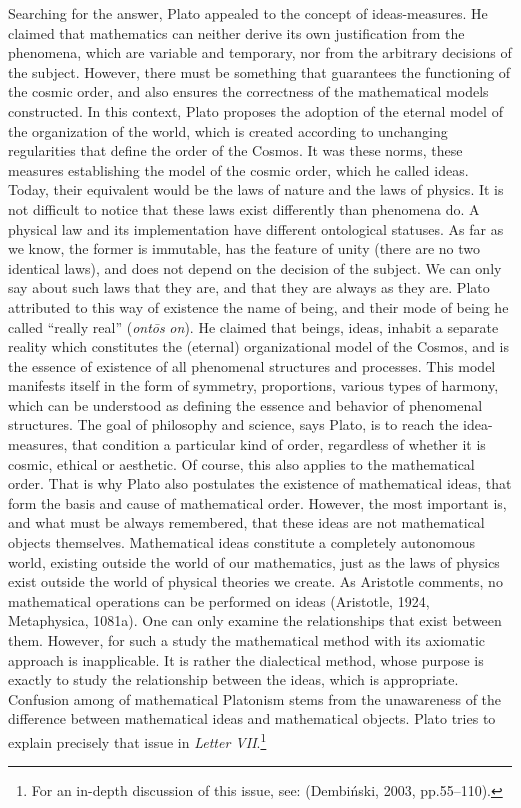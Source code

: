 \documentclass[a4paper]{article}
\begin{document}
Searching for the answer, Plato appealed to the concept of ideas-measures. He claimed that mathematics can neither
derive its own justification from the phenomena, which are variable and temporary, nor from the arbitrary decisions of
the subject. However, there must be something that guarantees the functioning of the cosmic order, and also ensures the
correctness of the mathematical models constructed. In this context, Plato proposes the %
adoption of the eternal model of the organization of the world, which is created according to unchanging regularities
that define the order of the Cosmos. It was these norms, these measures establishing the model of the cosmic order,
which he called ideas. Today, their equivalent would be the laws of nature and the laws of physics. It is not difficult
to notice that these laws exist differently than phenomena do. A physical law and its implementation have different
ontological statuses. As far as we know, the former is immutable, has the feature of unity (there are no two identical
laws), and does not depend on the decision of the subject. We can only say about such laws that they are, and that they
are always as they are. Plato attributed to this way of existence the name of being, and their mode of being he called
“really real” (\textit{ont\=os}\textbf{\textit{ }}\textit{on}). He claimed that beings, ideas, inhabit a separate
reality which constitutes the (eternal) organizational model of the Cosmos, and is the essence of existence of all
phenomenal structures and processes. This model manifests itself in the form of symmetry, proportions, various types of
harmony, which can be understood as defining the essence and behavior of phenomenal structures. The goal of philosophy
and science, says Plato, is to reach the idea-measures, that condition a particular kind of order, regardless of
whether it is cosmic, ethical or aesthetic. Of course, this also applies to the mathematical order. That is why Plato
also postulates the existence of mathematical ideas, that form the basis and cause of mathematical order. However, the
most important is, and what must be always remembered, that these ideas are not mathematical objects themselves.
Mathematical ideas constitute a completely autonomous world, existing outside the world of our mathematics, just as the
laws of physics exist outside the world of physical theories we create. As Aristotle comments, no mathematical
operations can be performed on ideas \label{ref:RND7l8LNNPyp8}(Aristotle, 1924, Metaphysica, 1081a). One can only
examine the relationships that exist between them. However, for such a study the mathematical method with its axiomatic
approach is inapplicable. It is rather the dialectical method, whose purpose is exactly to study the relationship
between the ideas, which is appropriate. Confusion among of mathematical Platonism stems from the unawareness of the
difference between mathematical ideas and mathematical objects. Plato tries to explain precisely that issue in
\textit{Letter VII}.\footnote{For an in-depth discussion of this issue, see: \label{ref:RNDgH1femURQM}(Dembiński, 2003,
pp.55–110).}
\end{document}
